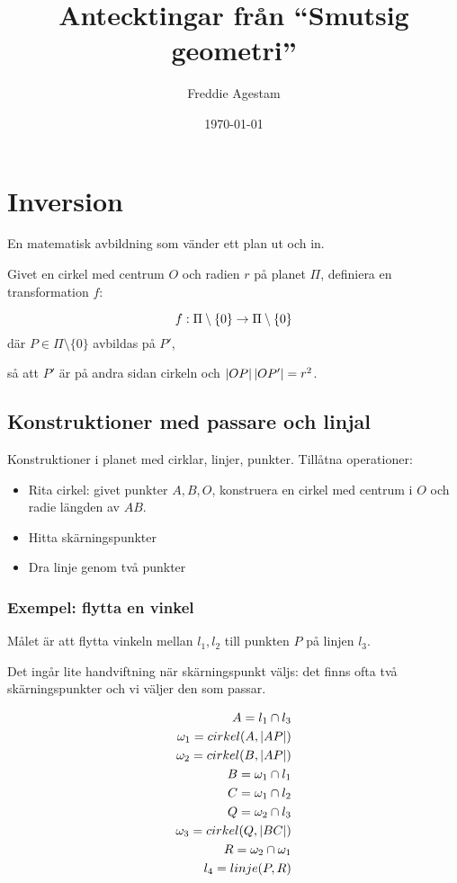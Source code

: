 \documentclass[10pt,a4paper]{article}
\author{Freddie Agestam}
\title{Antecktingar från ``Smutsig geometri''}
\date{\today}
\begin{document}


\maketitle

\section{Inversion}
En matematisk avbildning som vänder ett plan ut och in.

Givet en cirkel med centrum $O$ och radien $r$ på planet $\Pi$, definiera en transformation $f$:

\[ f: \Pi \setminus \{ 0 \} \rightarrow \Pi \setminus \{ 0 \} \]
där $P \in \Pi \setminus \{ 0 \}$ avbildas på $P'$,

så att $P'$ är på andra sidan cirkeln och $\left|OP\right| \left|OP'\right| = r^2$.

\subsection{Konstruktioner med passare och linjal}
Konstruktioner i planet med cirklar, linjer, punkter. Tillåtna operationer:

\begin{itemize}
\item Rita cirkel: givet punkter $A,B,O$, konstruera en cirkel med centrum i $O$ och radie längden av $AB$.
\item Hitta skärningspunkter
\item Dra linje genom två punkter
\end{itemize}

\subsubsection{Exempel: flytta en vinkel}
Målet är att flytta vinkeln mellan $l_1,l_2$ till punkten $P$ på linjen $l_3$.


Det ingår lite handviftning när skärningspunkt väljs: det finns ofta två skärningspunkter och vi väljer den som passar.

\begin{eqnarray*}
A = l_1 \cap l_3 \\
\omega_1 = cirkel(A, \left|AP\right|) \\
\omega_2 = cirkel(B, \left|AP\right|) \\
B = \omega_1 \cap l_1 \\
C = \omega_1 \cap l_2 \\
Q = \omega_2 \cap l_3 \\
\omega_3 = cirkel(Q, \left|BC\right|) \\
R = \omega_2 \cap \omega_1 \\
l_4 = linje(P,R)
\end{eqnarray*}
\end{document}
